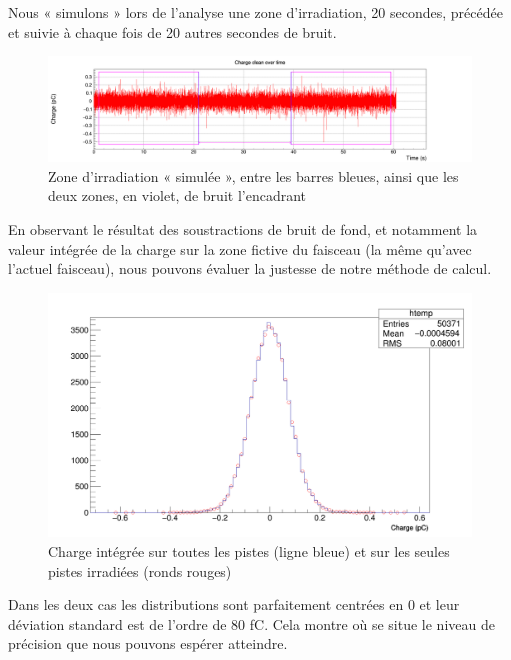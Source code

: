 \documentclass[a4paper,11pt]{article}
\begin{document}
Nous « simulons » lors de l’analyse une zone d’irradiation, 20 secondes, précédée et suivie à chaque fois de 20 autres secondes de bruit.
\begin{figure}[h]
\begin{center}
\includegraphics[scale=0.2]{Charge_clean.png} 
\caption{\label{fig:chargec}\footnotesize{Zone d'irradiation « simulée », entre les barres bleues, ainsi que les deux zones, en violet, de bruit l'encadrant}}
\end{center}
\end{figure}
En observant le résultat des soustractions de bruit de fond, et notamment la valeur intégrée de la charge sur la zone fictive du faisceau (la même qu’avec l’actuel faisceau), nous pouvons évaluer la justesse de notre méthode de calcul.
\begin{figure}[h]
\begin{center}
\includegraphics[scale=0.2]{Canvas_1.png} 
\caption{\label{fig:canvas}\footnotesize{Charge intégrée sur toutes les pistes (ligne bleue) et sur les seules pistes irradiées (ronds rouges)}}
\end{center}
\end{figure}
Dans les deux cas les distributions sont parfaitement centrées en 0 et leur déviation standard est de l’ordre de 80 fC.
Cela montre où se situe le niveau de précision que nous pouvons espérer atteindre.
\end{document}

